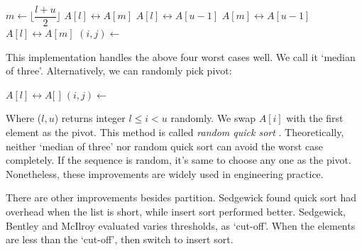 \documentclass[b5paper]{article}
\begin{document}
\begin{algorithmic}[1]
    \State $m \gets \lfloor \dfrac{l + u}{2} \rfloor$ 
     
      \State {} $A[l] \leftrightarrow A[m]$
    \EndIf
     
      \State {} $A[l] \leftrightarrow A[u-1]$
    \EndIf
     
      \State {} $A[m] \leftrightarrow A[u-1]$
    \EndIf
    \State {} $A[l] \leftrightarrow A[m]$
    \State $(i, j) \gets $ 
    \State {}
    \State {}
  \EndIf
\EndProcedure
\end{algorithmic}

This implementation handles the above four worst cases well. We call it `median of three'. Alternatively, we can randomly pick pivot:

\begin{algorithmic}[1]
    \State {} $A[l] \leftrightarrow A[$  $]$
    \State $(i, j) \gets $ 
    \State {}
    \State {}
  \EndIf
\EndProcedure
\end{algorithmic}

Where ($l, u$) returns integer $l \leq i < u$ randomly. We swap $A[i]$ with the first element as the pivot. This method is called {\em random quick sort} \cite{CLRS}. Theoretically, neither `median of three' nor random quick sort can avoid the worst case completely. If the sequence is random, it's same to choose any one as the pivot. Nonetheless, these improvements are widely used in engineering practice.

There are other improvements besides partition. Sedgewick found quick sort had overhead when the list is short, while insert sort performed better\cite{Bentley}\cite{3-way-part}. Sedgewick, Bentley and McIlroy evaluated varies thresholds, as `cut-off'. When the elements are less than the `cut-off', then switch to insert sort.

\begin{algorithmic}[1]
    \State {}
  \Else
    \State {}
  \EndIf
\EndProcedure
\end{algorithmic}
\end{document}
